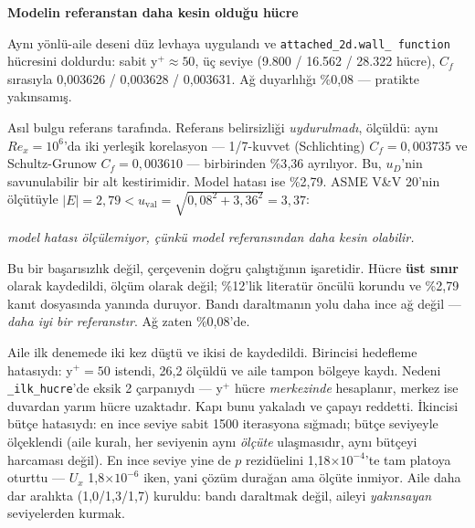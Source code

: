 \documentclass[11pt,a4paper]{article}
\newcommand{\kkkenar}{lacivert}
\newcommand{\kkzemin}{kod}
\newenvironment{renkkutu}[3]{%
  \renewcommand{\kkkenar}{#1}\renewcommand{\kkzemin}{#2}%
  \par\medskip\noindent
  \begin{lrbox}{\kutugovde}%
  \begin{minipage}{\dimexpr\linewidth-2\fboxsep-2\fboxrule\relax}\footnotesize
  \textcolor{#1}{\textbf{#3}}\par\vspace{3pt}%
}{%
  \end{minipage}%
  \end{lrbox}%
  \noindent\fcolorbox{\kkkenar}{\kkzemin}{\usebox{\kutugovde}}%
  \par\medskip
}
\newenvironment{olculdu}[1]{\begin{renkkutu}{iyi}{iyibg}{#1}}{\end{renkkutu}}
\begin{document}
\begin{olculdu}{Modelin referanstan daha kesin olduğu hücre}
Aynı yönlü-aile deseni düz levhaya uygulandı ve \texttt{attached\_2d.wall\_%
function} hücresini doldurdu: sabit y$^+{\approx}50$, üç seviye (9.800 /
16.562 / 28.322 hücre), $C_f$ sırasıyla 0{,}003626 / 0{,}003628 / 0{,}003631.
Ağ duyarlılığı \%0{,}08 --- pratikte yakınsamış.

Asıl bulgu referans tarafında. Referans belirsizliği \emph{uydurulmadı},
ölçüldü: aynı $Re_x{=}10^6$'da iki yerleşik korelasyon --- 1/7-kuvvet
(Schlichting) $C_f{=}0{,}003735$ ve Schultz-Grunow $C_f{=}0{,}003610$ ---
birbirinden \%3{,}36 ayrılıyor. Bu, $u_D$'nin savunulabilir bir alt
kestirimidir. Model hatası ise \%2{,}79. ASME V\&V 20'nin ölçütüyle
$|E| = 2{,}79 < u_{\mathrm{val}} = \sqrt{0{,}08^2+3{,}36^2} = 3{,}37$:

\begin{center}\itshape
model hatası ölçülemiyor, çünkü model referansından daha kesin olabilir.
\end{center}

\noindent Bu bir başarısızlık değil, çerçevenin doğru çalıştığının işaretidir.
Hücre \textbf{üst sınır} olarak kaydedildi, ölçüm olarak değil; \%12'lik
literatür öncülü korundu ve \%2{,}79 kanıt dosyasında yanında duruyor. Bandı
daraltmanın yolu daha ince ağ değil --- \emph{daha iyi bir referanstır}. Ağ
zaten \%0{,}08'de.

Aile ilk denemede iki kez düştü ve ikisi de kaydedildi. Birincisi hedefleme
hatasıydı: y$^+{=}50$ istendi, 26{,}2 ölçüldü ve aile tampon bölgeye kaydı.
Nedeni \texttt{\_ilk\_hucre}'de eksik 2 çarpanıydı --- y$^+$ hücre
\emph{merkezinde} hesaplanır, merkez ise duvardan yarım hücre uzaktadır. Kapı
bunu yakaladı ve çapayı reddetti. İkincisi bütçe hatasıydı: en ince seviye
sabit 1500 iterasyona sığmadı; bütçe seviyeyle ölçeklendi (aile kuralı, her
seviyenin aynı \emph{ölçüte} ulaşmasıdır, aynı bütçeyi harcaması değil). En
ince seviye yine de $p$ rezidüelini 1{,}18$\times10^{-4}$'te tam platoya
oturttu --- $U_x$ 1{,}8$\times10^{-6}$ iken, yani çözüm durağan ama ölçüte
inmiyor. Aile daha dar aralıkta (1{,}0/1{,}3/1{,}7) kuruldu: bandı daraltmak
değil, aileyi \emph{yakınsayan} seviyelerden kurmak.
\end{olculdu}
\end{document}
